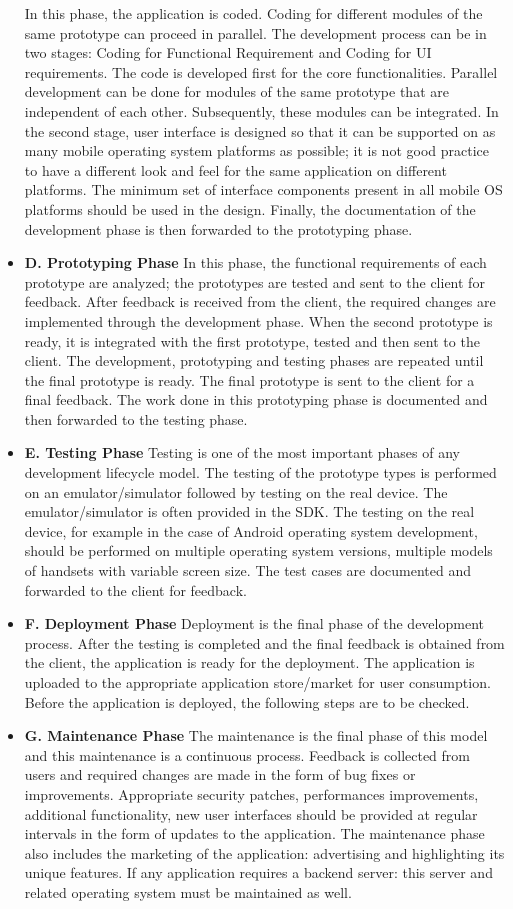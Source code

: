 \documentclass[10pt,slovak,a4paper]{article}
\begin{document}
\begin{itemize}
In this phase, the application is coded. Coding for different modules of the same prototype can proceed in parallel. The development process can be in two stages: Coding for Functional Requirement and Coding for UI requirements. The code is developed first for the core functionalities. Parallel development can be done for modules of the same prototype that are independent of each other. Subsequently, these modules can be integrated. In the second stage, user interface is designed so that it can be supported on as many mobile operating system platforms as possible; it is not good practice to have a different look and feel for the same application on different platforms. The minimum set of interface components present in all mobile OS platforms should be used in the design. Finally, the documentation of the development phase is then forwarded to the prototyping phase.
  \item \textbf{D. Prototyping Phase}
In this phase, the functional requirements of each prototype are analyzed; the prototypes are tested and sent to the client for feedback. After feedback is received from the client, the required changes are implemented through the development phase. When the second prototype is ready, it is integrated with the first prototype, tested and then sent to the client. The development, prototyping and testing phases are repeated until the final prototype is ready. The final prototype is sent to the client for a final feedback. The work done in this prototyping phase is documented and then forwarded to the testing phase.
  \item \textbf{E. Testing Phase}
Testing is one of the most important phases of any development lifecycle model. The testing of the prototype types is performed on an emulator/simulator followed by testing on the real device. The emulator/simulator is often provided in the SDK. The testing on the real device, for example in the case of Android operating system development, should be performed on multiple operating system versions, multiple models of handsets with variable screen size. The test cases are documented and forwarded to the client for feedback.
  \item \textbf{F. Deployment Phase}
Deployment is the final phase of the development process. After the testing is completed and the final feedback is obtained from the client, the application is ready for the deployment. The application is uploaded to the appropriate application store/market for user consumption. Before the application is deployed, the following steps are to be checked.
  \item \textbf{G. Maintenance Phase}
The maintenance is the final phase of this model and this maintenance is a continuous process. Feedback is collected from users and required changes are made in the form of bug fixes or improvements. Appropriate security patches, performances improvements, additional functionality, new user interfaces should be provided at regular intervals in the form of updates to the application. The maintenance phase also includes the marketing of the application: advertising and highlighting its unique features. If any application requires a backend server: this server and related operating system must be maintained as well.
\end{itemize}
\end{document}
